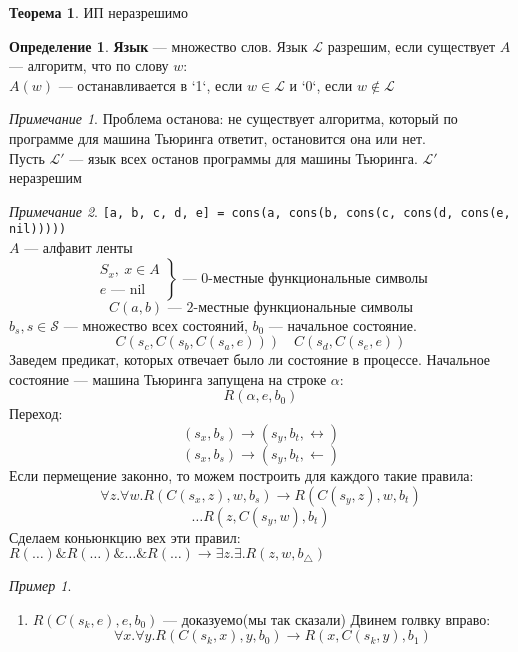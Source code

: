 \documentclass[english]{article}
\newcommand{\fixme}{{\color{red}\fbox{\text{Исправить}}}}
\theoremstyle{plain}
\theoremstyle{remark}
\newtheorem*{remark}{Примечание}
\newtheorem*{examp}{Пример}
\theoremstyle{definition}
\newtheorem{theorem}{Теорема}[section]
\newtheorem*{definition}{Определение}
\begin{document}
\begin{theorem}
ИП неразрешимо
\end{theorem}
\begin{definition}
\textbf{Язык} --- множество слов. Язык \(\mathcal{L}\) разрешим, если существует \(A\) --- алгоритм, что по слову \(w\): \\
\(A(w)\) --- останавливается в `1`, если \(w \in \mathcal{L}\) и `0`, если \(w \not\in \mathcal{L}\)
\end{definition}
\begin{remark}
Проблема останова: не существует алгоритма, который по программе для машина Тьюринга ответит, остановится она или нет. \\
Пусть \(\mathcal{L}'\) --- язык всех останов программы для машины Тьюринга. \(\mathcal{L}'\) неразрешим
\end{remark}
\begin{remark}
\texttt{[a, b, c, d, e] = cons(a, cons(b, cons(c, cons(d, cons(e, nil)))))} \\
\(A\) --- алфавит ленты
\[ \left.\begin{array}{l}
S_x,\ x \in A \\
e \text{ --- } \text{nil}
\end{array}\right\} \text{ --- } 0\text{-местные функциональные символы}\]
\[ C(a, b) \text{ --- } 2\text{-местные функциональные символы} \]
\(b_s, s \in \mathcal{S}\) --- множество всех состояний, \(b_0\) --- начальное состояние.
\[ C(s_c, C(s_b, C(s_a, e))) \quad C(s_d, C(s_e, e)) \]
Заведем предикат, которых отвечает было ли состояние в процессе. Начальное состояние --- машина Тьюринга запущена на строке \(\alpha\):
\[ R(\alpha, e, b_0) \]
Переход:
\[ (s_x, b_s) \to (s_y, b_t, \leftrightarrow) \]
\[ (s_x, b_s) \to (s_y, b_t, \leftarrow) \]
Если пермещение законно, то можем построить для каждого такие правила:
\[ \forall z. \forall w. R(C(s_x, z), w, b_s) \to R(C(s_y, z), w, b_t) \]
\[ \dots  R(z, C(s_y, w), b_t)\]
Сделаем коньюнкцию вех эти правил: \(R(\dots)\&R(\dots)\&\dots\&R(\dots) \to \exists z. \exists . R(z, w, b_\triangle)\)
\fixme
\end{remark}
\begin{examp}
\-
\begin{enumerate}
\item \(R(C(s_k, e), e, b_0)\) --- доказуемо(мы так сказали)
Двинем голвку вправо:
\[ \forall x. \forall y. R(C(s_k, x), y, b_0) \to R(x, C(s_k, y), b_1) \]
\end{enumerate}
\end{examp}
\end{document}
